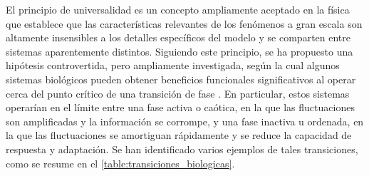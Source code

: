 El principio de universalidad es un concepto ampliamente aceptado en la física que establece que las características relevantes de los fenómenos a gran escala son altamente insensibles a los detalles específicos del modelo y se comparten entre sistemas aparentemente distintos. Siguiendo este principio, se ha propuesto una hipótesis controvertida, pero ampliamente investigada, según la cual algunos sistemas biológicos pueden obtener beneficios funcionales significativos al operar cerca del punto crítico de una transición de fase \cite{munoz_colloquium_2018,hidalgo_information-based_2014,kauffman_origins_1993,bak_how_1996,chialvo_brain_2008,chialvo_emergent_2010,plenz_critical_2013,niebur_criticality_2014,shew_functional_2013,cocchi_criticality_2017,zimmern_why_2020}. En particular, estos sistemas operarían en el límite entre una fase activa o caótica, en la que las fluctuaciones son amplificadas y la información se corrompe, y una fase inactiva u ordenada, en la que las fluctuaciones se amortiguan rápidamente y se reduce la capacidad de respuesta y adaptación. Se han identificado varios ejemplos de tales transiciones, como se resume en el \cref{table:transiciones_biologicas}.









